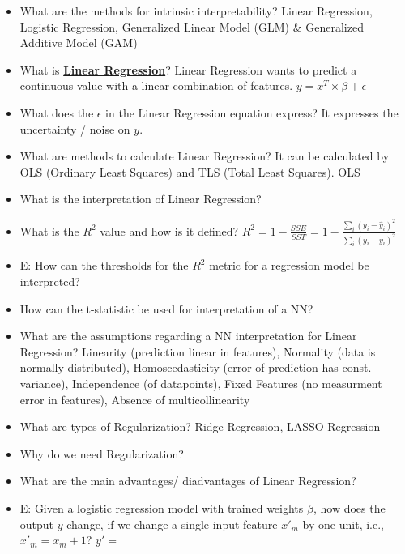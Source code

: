 \documentclass{report}
\begin{document}
	\begin{itemize}
	\item What are the methods for intrinsic interpretability?
	\newline Linear Regression, Logistic Regression, Generalized Linear Model (GLM) \& Generalized Additive Model (GAM)
	
	\item What is \textbf{\underline{Linear Regression}}?
	\newline Linear Regression wants to predict a continuous value with a linear combination of features.
	\newline $y = x^T \times \beta + \epsilon$
	\item What does the $\epsilon$ in the Linear Regression equation express?
	\newline It expresses the uncertainty / noise on $y$.
	\item What are methods to calculate Linear Regression?
	\newline It can be calculated by OLS (Ordinary Least Squares) and TLS (Total Least Squares).
	\newline OLS
	\item What is the interpretation of Linear Regression?
	\newline 
	\item What is the $R^2$ value and how is it defined?
	\newline $R^2 = 1 - \frac{SSE}{SST} = 1 - \frac{\sum_{i} (y_i - \hat{y}_i)^2}{\sum_i (y_i - \overline{y}_i)^2}$
	\item E: How can the thresholds for the $R^2$ metric for a regression model be interpreted?
	\newline 
	\item How can the t-statistic be used for interpretation of a NN?
	\newline 
	\item What are the assumptions regarding a NN interpretation for Linear Regression?
	\newline Linearity (prediction linear in features), Normality (data is normally distributed), Homoscedasticity (error of prediction has const. variance), Independence (of datapoints), Fixed Features (no measurment error in features), Absence of multicollinearity
	\item What are types of Regularization?
	\newline Ridge Regression, LASSO Regression
	\item Why do we need Regularization?
	\newline 
	\item What are the main advantages/ diadvantages of Linear Regression?
	\newline 
	\item E: Given a logistic regression model with trained weights $\beta$, how does the output $y$ change, if we change a single input feature $x'_m$ by one unit, i.e., $x'_m = x_m + 1$?
	\newline $y' = $
	

\end{itemize}
\end{document}
